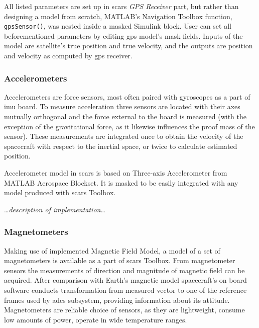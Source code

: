 
        All listed parameters are set up in \ac{scars} \textit{GPS Receiver} part, but rather than designing a model from scratch, MATLAB's Navigation Toolbox function, \verb|gpsSensor()|, was nested inside a masked Simulink block. User can set all beforementioned parameters by editing \ac{gps} model's mask fields. Inputs of the model are satellite's true position and true velocity, and the outputs are position and velocity as computed by \ac{gps} receiver.


    \subsubsection{Accelerometers}
        Accelerometers are force sensors, most often paired with gyroscopes as a part of \ac{imu} board. To measure acceleration three sensors are located with their axes mutually orthogonal and the force external to the board is measured (with the exception of the gravitational force, as it likewise influences the proof mass of the sensor). These measurements are integrated once to obtain the velocity of the spacecraft with respect to the inertial space, or twice to calculate estimated position.

        Accelerometer model in \ac{scars} is based on Three-axis Accelerometer from MATLAB Aerospace Blockset. It is masked to be easily integrated with any model produced with \ac{scars} Toolbox.


        \dots\textit{description of implementation}\dots

    \subsubsection{Magnetometers}
        Making use of implemented Magnetic Field Model, a model of a set of magnetometers is available as a part of \ac{scars} Toolbox. From magnetometer sensors the measurements of direction and magnitude of magnetic field can be acquired. After comparison with Earth's magnetic model spacecraft's on board software conducts transformation from measured vector to one of the reference frames used by \ac{adcs} subsystem, providing information about its attitude. Magnetometers are reliable choice of sensors, as they are lightweight, consume low amounts of power, operate in wide temperature ranges. 

